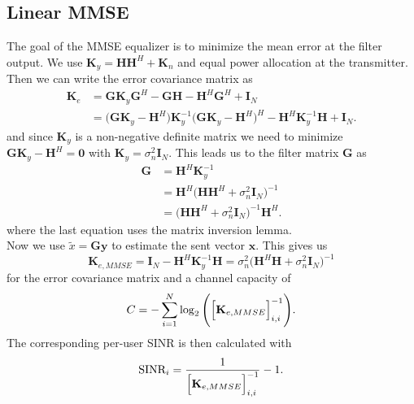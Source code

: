 \subsection{Linear MMSE}
The goal of the MMSE equalizer is to minimize the mean error at the filter output. We use $\mathbf{K}_y = \mathbf{HH}^H + \mathbf{K}_n$ and equal power allocation at the transmitter. Then we can write the error covariance matrix as
\begin{align}
	\mathbf{K}_e &= \mathbf{GK}_y\mathbf{G}^H - \mathbf{GH} - \mathbf{H}^H\mathbf{G}^H + \mathbf{I}_N\\
	&=\Biggr(\mathbf{GK}_y - \mathbf{H}^H\Biggl) \mathbf{K}_y^{-1} \Biggr(\mathbf{GK}_y - \mathbf{H}^H\Biggl)^H - \mathbf{H}^H\mathbf{K}_y^{-1}\mathbf{H}+\mathbf{I}_N.
\end{align}
and since $\mathbf{K}_y$ is a non-negative definite matrix we need to minimize $\mathbf{GK}_y-\mathbf{H}^H\bigl=\mathbf{0}$ with $\mathbf{K}_y = \sigma_n^2\mathbf{I}_N$. This leads us to the filter matrix $\mathbf{G}$ as
\begin{align}
	\mathbf{G} &= \mathbf{H}^H\mathbf{K}_y^{-1}\\
	&= \mathbf{H}^H\Biggr(\mathbf{HH}^H + \sigma_n^2\mathbf{I}_N\Biggl)^{-1}\\
	&=\Biggr(\mathbf{HH}^H + \sigma_n^2\mathbf{I}_N\Biggl)^{-1}\mathbf{H}^H.
\end{align}
where the last equation uses the matrix inversion lemma.\\
Now we use $\tilde{x} = \mathbf{Gy}$ to estimate the sent vector $\mathbf{x}$. This gives us
\begin{equation}
	\mathbf{K}_{e,MMSE} = \mathbf{I}_N - \mathbf{H}^H\mathbf{K}_y^{-1}\mathbf{H} = \sigma_n^2\Biggr(\mathbf{H}^H\mathbf{H} + \sigma_n^2\mathbf{I}_N\Biggl)^{-1}
\end{equation}
for the error covariance matrix and a channel capacity of
\begin{equation}
	C = -\sum_{i=1}^{N}{\log_2{\Biggr(\Bigr[\mathbf{K}_{e,MMSE}\Bigl]_{i,i}^{-1}\Biggl)}}.
\end{equation}
The corresponding per-user SINR is then calculated with
\begin{equation}
	\text{SINR}_{i} = \frac{1}{\Bigr[\mathbf{K}_{e,MMSE}\Bigl]_{i,i}^{-1}} - 1.
\end{equation}

